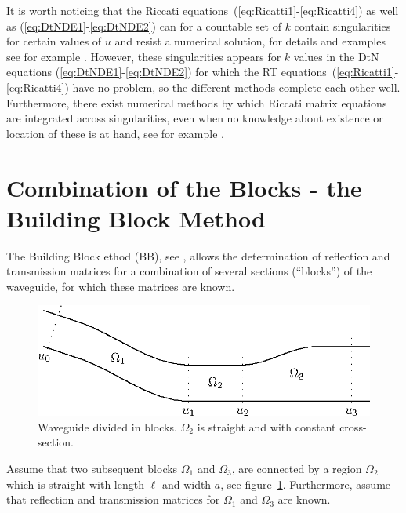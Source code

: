\documentclass[numreferences]{kluwer}
\begin{document}
It is worth noticing that the Riccati
equations~(\ref{eq:Ricatti1}-\ref{eq:Ricatti4}) as well as
(\ref{eq:DtNDE1}-\ref{eq:DtNDE2}) can for a countable set of $k$
contain singularities for certain values of $u$ and resist a numerical
solution, for details and examples see for example
\cite{Fishman:1998}. However, these singularities appears for $k$
values in the DtN equations (\ref{eq:DtNDE1}-\ref{eq:DtNDE2}) for
which the RT equations~(\ref{eq:Ricatti1}-\ref{eq:Ricatti4}) have no
problem, so the different methods complete each other
well. Furthermore, there exist numerical methods by which Riccati
matrix equations are integrated across singularities, even when no
knowledge about existence or location of these is at hand, see for
example \cite{Li-Kahan:2012}.


\section{Combination of the Blocks - the Building
 Block Method}
\label{sec:comb-blocks-build}

The Building Block ethod (BB), see \cite{nilssonbrander1981b}, allows
the determination of reflection and transmission matrices for a
combination of several sections (``blocks'') of the waveguide, for
which these matrices are known.

\begin{figure}[htb]
  \centering
  \includegraphics[width=\textwidth]{BBMwg-1}
  \caption{Waveguide divided in blocks. $\Omega_2$ is straight and
    with constant cross-section.}
  \label{fig:wg4}
\end{figure}


Assume that two subsequent blocks $\Omega_1$ and $\Omega_3$, are
connected by a region $\Omega_2$ which is straight with length $\ell$
and width $a$, see figure~\ref{fig:wg4}.  Furthermore, assume that
reflection and transmission matrices for $\Omega_1$ and $\Omega_3$ are
known.
\end{document}
